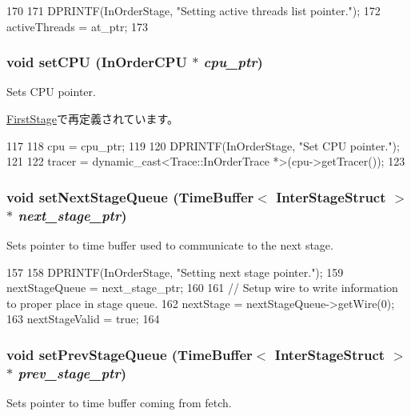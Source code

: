 \begin{DoxyCode}
170 {
171     DPRINTF(InOrderStage, "Setting active threads list pointer.\n");
172     activeThreads = at_ptr;
173 }
\end{DoxyCode}
\hypertarget{classPipelineStage_a6fd0f914e19bcfb6d9f28e537ad956d5}{
\subsubsection[{setCPU}]{\setlength{\rightskip}{0pt plus 5cm}void setCPU ({\bf InOrderCPU} $\ast$ {\em cpu\_\-ptr})}}
\label{classPipelineStage_a6fd0f914e19bcfb6d9f28e537ad956d5}
Sets CPU pointer. 

\hyperlink{classFirstStage_a6fd0f914e19bcfb6d9f28e537ad956d5}{FirstStage}で再定義されています。


\begin{DoxyCode}
117 {
118     cpu = cpu_ptr;
119 
120     DPRINTF(InOrderStage, "Set CPU pointer.\n");
121 
122     tracer = dynamic_cast<Trace::InOrderTrace *>(cpu->getTracer());
123 }
\end{DoxyCode}
\hypertarget{classPipelineStage_ace33f1daf903e9438330807405092e20}{
\subsubsection[{setNextStageQueue}]{\setlength{\rightskip}{0pt plus 5cm}void setNextStageQueue ({\bf TimeBuffer}$<$ {\bf InterStageStruct} $>$ $\ast$ {\em next\_\-stage\_\-ptr})}}
\label{classPipelineStage_ace33f1daf903e9438330807405092e20}
Sets pointer to time buffer used to communicate to the next stage. 


\begin{DoxyCode}
157 {
158     DPRINTF(InOrderStage, "Setting next stage pointer.\n");
159     nextStageQueue = next_stage_ptr;
160 
161     // Setup wire to write information to proper place in stage queue.
162     nextStage = nextStageQueue->getWire(0);
163     nextStageValid = true;
164 }
\end{DoxyCode}
\hypertarget{classPipelineStage_aff9a9995beb69e92bbcf40c780c17b93}{
\subsubsection[{setPrevStageQueue}]{\setlength{\rightskip}{0pt plus 5cm}void setPrevStageQueue ({\bf TimeBuffer}$<$ {\bf InterStageStruct} $>$ $\ast$ {\em prev\_\-stage\_\-ptr})}}
\label{classPipelineStage_aff9a9995beb69e92bbcf40c780c17b93}
Sets pointer to time buffer coming from fetch. 



